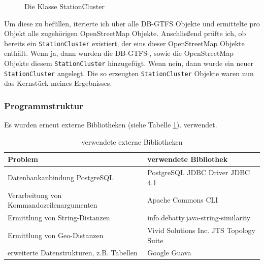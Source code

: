 \begin{figure}[htb]
   \centering
   \caption{Die Klasse StationCluster}
   \label{fig:gtfs2osm:stationcluster}
 \end{figure}

Um diese zu befüllen, iterierte ich über alle DB-GTFS Objekte und ermittelte pro Objekt alle zugehörigen OpenStreetMap Objekte.
Anschließend prüfte ich, ob bereits ein \texttt{StationCluster} existiert, der eins dieser OpenStreetMap Objekte enthält.
Wenn ja, dann wurden die DB-GTFS-, sowie die OpenStreetMap Objekte diesem \texttt{StationCluster} hinzugefügt.
Wenn nein, dann wurde ein neuer \texttt{StationCluster} angelegt.
Die so erzeugten \texttt{StationCluster} Objekte waren nun das Kernstück meines Ergebnisses.


\subsubsection{Programmstruktur}

Es wurden erneut externe Bibliotheken (siehe Tabelle \ref{tab:GTFS2OSM:Libraries}). verwendet. 
\begin{table}[htb]
\small
\centering
\caption{verwendete externe Bibliotheken}
\label{tab:GTFS2OSM:Libraries}
\begin{tabular}{|l|l|}
\hline
\textbf{Problem}                          & \textbf{verwendete Bibliothek}     \\ \hline
Datenbankanbindung PostgreSQL             & PostgreSQL JDBC Driver JDBC 4.1    \\ \hline
Verarbeitung von Kommandozeilenargumenten & Apache Commons CLI                 \\ \hline
Ermittlung von String-Distanzen           & info.debatty.java-string-similarity         \\ \hline
Ermittlung von Geo-Distanzen           & Vivid Solutions Inc. JTS Topology Suite         \\ \hline
erweiterte Datenstrukturen, z.B. Tabellen & Google Guava          \\ \hline
\end{tabular}
\end{table}

